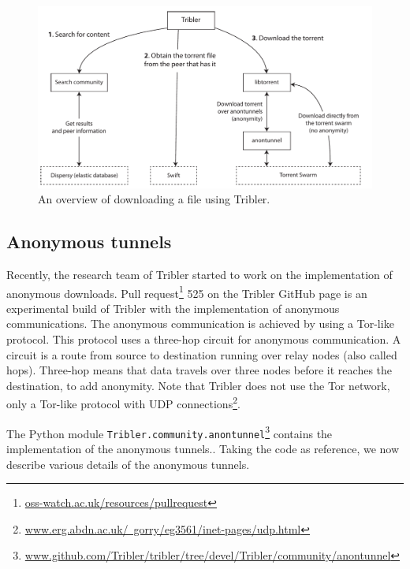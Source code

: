 		\begin{figure}[!htb]
			\centering
			\includegraphics[width=\textwidth]{graphics/tribler-overview.pdf}
			\caption{An overview of downloading a file using Tribler.}
			\label{fig:tribleroverview}
		\end{figure}
	
	\subsection{Anonymous tunnels}
		\label{sec:anonymoustunnels}
			Recently, the research team of Tribler started to work on the implementation of anonymous downloads. Pull request\footnote{\href{http://oss-watch.ac.uk/resources/pullrequest}{oss-watch.ac.uk/resources/pullrequest}} 525 on the Tribler GitHub page \cite{pullrequest525} is an experimental build of Tribler with the implementation of anonymous communications. The anonymous communication is achieved by using a Tor-like protocol. This protocol uses a three-hop circuit for anonymous communication. A circuit is a route from source to destination running over relay nodes (also called hops). Three-hop means that data travels over three nodes before it reaches the destination, to add anonymity. Note that Tribler does not use the Tor network, only a Tor-like protocol with UDP connections\footnote{\href{http://www.erg.abdn.ac.uk/~gorry/eg3561/inet-pages/udp.html}{www.erg.abdn.ac.uk/~gorry/eg3561/inet-pages/udp.html}}.
			
			The Python module \texttt{Tribler.community.anontunnel}\footnote{\href{https://github.com/Tribler/tribler/tree/devel/Tribler/community/anontunnel}{www.github.com/Tribler/tribler/tree/devel/Tribler/community/anontunnel}} contains the implementation of the anonymous tunnels.. Taking the code as reference, we now describe various details of the anonymous tunnels.
			
